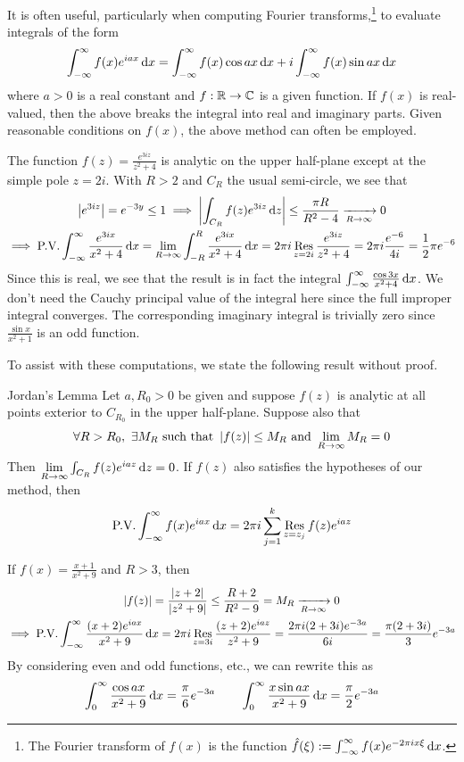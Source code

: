 
It is often useful, particularly when computing Fourier transforms,\footnote{The Fourier transform of $f(x)$ is the function $\hat f(\xi):=\int_{-\infty}^\infty f(x)e^{-2\pi ix\xi}\,{\mathrm{d} x}$.} to evaluate integrals of the form
\[\int_{-\infty}^\infty f(x)e^{iax}\,{\mathrm{d} x}=\int_{-\infty}^\infty f(x)\cos ax\,{\mathrm{d} x}+i\int_{-\infty}^\infty f(x)\sin ax\,{\mathrm{d} x}\]
where $a>0$ is a real constant and $f:\mathbb{R}\to\mathbb{C}$ is a given function. If $f(x)$ is real-valued, then the above breaks the integral into real and imaginary parts. Given reasonable conditions on $f(x)$, the above method can often be employed.

\begin{example}{}{}
The function $f(z)=\frac{e^{3iz}}{z^2+4}$ is analytic on the upper half-plane except at the simple pole $z=2i$. With $R>2$ and $C_R$ the usual semi-circle, we see that
\begin{gather*}
\left| e^{3iz}\right|=e^{-3y}\le 1\implies \left| \int_{C_R}f(z)e^{3iz}\,{\mathrm{d} z}\right|\le \frac{\pi R}{R^2-4}\xrightarrow[R\to\infty]{} 0\\
\implies \text{P.V.}\int_{-\infty}^\infty \frac{e^{3ix}}{x^2+4}\,{\mathrm{d} x} =\lim_{R\to\infty}\int_{-R}^R \frac{e^{3ix}}{x^2+4}\,{\mathrm{d} x} =2\pi i\operatorname*{Res}_{z=2i}\frac{e^{3iz}}{z^2+4} =2\pi i\frac{e^{-6}}{4i} =\frac 12\pi e^{-6}
\end{gather*}
Since this is real, we see that the result is in fact the integral $\int_{-\infty}^\infty \frac{\cos 3x}{x^2+4}\,{\mathrm{d} x}$. We don't need the Cauchy principal value of the integral here since the full improper integral converges. The corresponding imaginary integral is trivially zero since $\frac{\sin x}{x^2+1}$ is an odd function.
\end{example}

To assist with these computations, we state the following result without proof.

\begin{thm}{Jordan's Lemma}{}
Let $a,R_0>0$ be given and suppose $f(z)$ is analytic at all points exterior to $C_{R_0}$ in the upper half-plane. Suppose also that
\[\forall R>R_0,\ \exists M_R\text{ such that }\left| f(z)\right|\le M_R\text{ and }\lim_{R\to\infty}M_R=0\]
Then $\lim\limits_{R\to\infty}\int_{C_R}f(z)e^{iaz}\,{\mathrm{d} z}=0$. If $f(z)$ also satisfies the hypotheses of our method, then
\[\text{P.V.}\int_{-\infty}^\infty f(x)e^{iax}\,{\mathrm{d} x}=2\pi i\sum_{j=1}^k\operatorname*{Res}_{z=z_j}f(z)e^{iaz}\]
\end{thm}

\begin{example}{}{}
If $f(x)=\frac{x+1}{x^2+9}$ and $R>3$, then
\begin{gather*}
\left| f(z)\right|=\frac{\left| z+2\right|}{\left| z^2+9\right|}\le\frac{R+2}{R^2-9} =M_R\xrightarrow[R\to\infty]{}0\\
\implies \text{P.V.}\int_{-\infty}^\infty\frac{(x+2)e^{iax}}{x^2+9}\,{\mathrm{d} x}=2\pi i\operatorname*{Res}_{z=3i}\frac{(z+2)e^{iaz}}{z^2+9}=\frac{2\pi i(2+3i)e^{-3a}}{6i} =\frac{\pi(2+3i)}3e^{-3a}
\end{gather*}
By considering even and odd functions, etc., we can rewrite this as
\[\int_0^\infty\frac{\cos ax}{x^2+9}\,{\mathrm{d} x} =\frac{\pi}{6}e^{-3a}\qquad \int_0^\infty\frac{x\sin ax}{x^2+9}\,{\mathrm{d} x} =\frac{\pi}{2}e^{-3a}\]
\end{example}

